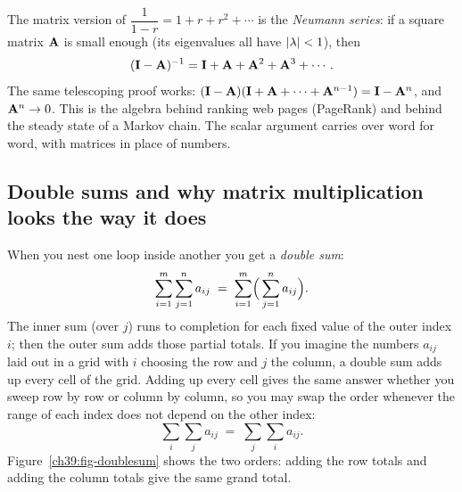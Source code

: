 \begin{connectionbox}
The matrix version of $\dfrac{1}{1-r} = 1 + r + r^2 + \cdots$ is the \emph{Neumann series}: if a
square matrix $\mathbf{A}$ is small enough (its eigenvalues all have $\lvert\lambda\rvert < 1$), then
\[
(\mathbf{I} - \mathbf{A})^{-1} = \mathbf{I} + \mathbf{A} + \mathbf{A}^2 + \mathbf{A}^3 + \cdots.
\]
The same telescoping proof works: $(\mathbf{I}-\mathbf{A})(\mathbf{I} + \mathbf{A} + \cdots + \mathbf{A}^{n-1}) =
\mathbf{I} - \mathbf{A}^n$, and $\mathbf{A}^n \to 0$. This is the algebra behind ranking web pages
(PageRank) and behind the steady state of a Markov chain. The scalar argument carries over word for
word, with matrices in place of numbers.
\end{connectionbox}

\subsection{Double sums and why matrix multiplication looks the way it does}
\label{ch39:double-sums}

When you nest one loop inside another you get a \emph{double sum}:
\[
\sum_{i=1}^{m}\sum_{j=1}^{n} a_{ij} \;=\; \sum_{i=1}^{m}\Bigl(\,\sum_{j=1}^{n} a_{ij}\Bigr).
\]
The inner sum (over $j$) runs to completion for each fixed value of the outer index $i$; then the
outer sum adds those partial totals. If you imagine the numbers $a_{ij}$ laid out in a grid with $i$
choosing the row and $j$ the column, a double sum adds up every cell of the grid. Adding up every
cell gives the same answer whether you sweep row by row or column by column, so you may swap the
order whenever the range of each index does not depend on the other index:
\[
\sum_{i}\sum_{j} a_{ij} \;=\; \sum_{j}\sum_{i} a_{ij}.
\]
Figure~\ref{ch39:fig-doublesum} shows the two orders: adding the row totals and adding the column
totals give the same grand total.

